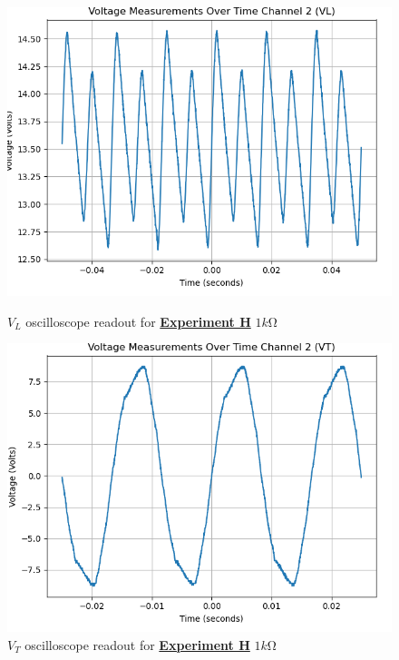 \documentclass[
	letterpaper
	12pt
]{template}
\newcommand{\bref}[2]{\textbf{\hyperref[#1]{#2}}}
\begin{document}
\begin{figure}[H]\label{data::H3}
	\centering
	\begin{minipage}[c]{0.45\textwidth}
		\centering
		\includegraphics[width=\textwidth]{figures/H/5--ch2.png}
	    \caption{$V_{L}$ oscilloscope readout for \bref{exp::H}{Experiment H} $1\unit{k\ohm}$ }
	\end{minipage}
	\hfill
	\begin{minipage}[c]{0.45\textwidth}
		\centering
		\includegraphics[width=\textwidth]{figures/H/6--ch2.png}
	    \caption{$V_{T}$ oscilloscope readout for \bref{exp::H}{Experiment H} $1\unit{k\ohm}$ }
	\end{minipage}
\end{figure}
\end{document}
